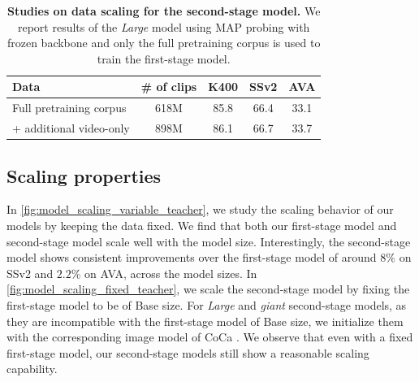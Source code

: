 \documentclass{article}
\theoremstyle{plain}
\theoremstyle{definition}
\theoremstyle{remark}
\begin{document}
\begin{table}[t]
\caption{\textbf{Studies on data scaling for the second-stage model.} We report results of the \textit{Large} model using MAP probing with frozen backbone and only the full pretraining corpus is used to train the first-stage model.}
	\label{tab:data_ablation_student}
	\vskip 0.1in
	\begin{center}
	\begin{scriptsize}
\begin{tabular}	{lcccc}
			\toprule
			Data & \# of clips &  \textbf{K400} & \textbf{SSv2} & \textbf{AVA} \\
			\midrule
	Full pretraining corpus & 618M & 85.8 & 66.4 & 33.1\\
	+ additional video-only  & 898M & 86.1 & 66.7 & 33.7\\
		\bottomrule
		\end{tabular}
\end{scriptsize}
	\end{center}
	\vskip -0.1in
\end{table}



\subsection{Scaling properties}

In \cref{fig:model_scaling_variable_teacher}, we study the scaling behavior of our models by keeping the data fixed. 
We find that both our first-stage model and second-stage model scale well with the model size.
Interestingly, the second-stage model shows consistent improvements over the first-stage model of around $8\%$ on SSv2  and $2.2\%$ on AVA, across the model sizes. 
In \cref{fig:model_scaling_fixed_teacher}, we scale the second-stage model by fixing the first-stage model to be of Base size.
For \textit{Large} and \textit{giant} second-stage models, as they are incompatible with the first-stage model of Base size, we initialize them with the corresponding image model of CoCa \cite{yu2022coca}.
We observe that even with a fixed first-stage model, our second-stage models still show a reasonable scaling capability.
\end{document}
